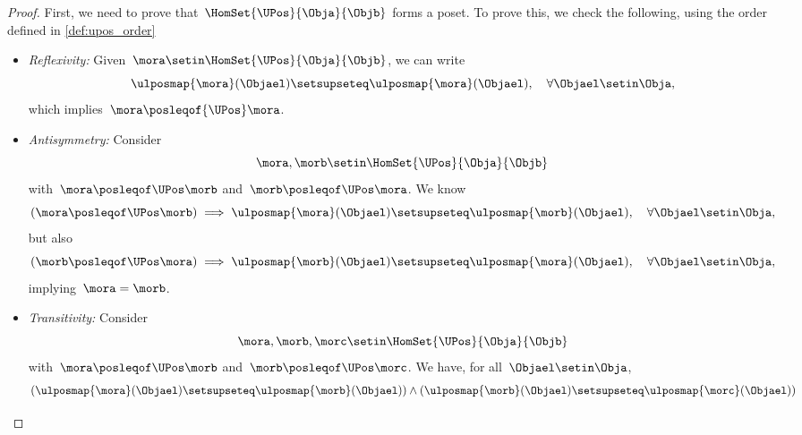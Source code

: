 \begin{proof}
    First, we need to prove that~$\HomSet{\UPos}{\Obja}{\Objb}$ forms a poset.
    To prove this, we check the following, using the order defined in \cref{def:upos_order}
    \begin{itemize}
        \item \emph{Reflexivity:} Given~$\mora \setin \HomSet{\UPos}{\Obja}{\Objb}$, we can write
              \begin{equation}
                  \ulposmap{\mora}(\Objael) \setsupseteq \ulposmap{\mora}(\Objael), \quad \forall \Objael \setin \Obja,
              \end{equation}
              which implies~$\mora \posleqof{\UPos} \mora$.
        \item \emph{Antisymmetry:}
              Consider
              \begin{equation}
                  \mora,\morb \setin \HomSet{\UPos}{\Obja}{\Objb}
              \end{equation} with~$\mora \posleqof\UPos \morb$ and~$\morb \posleqof\UPos \mora$.
              We know
              \begin{equation}
                  (\mora \posleqof\UPos \morb)
                  \implies \ulposmap{\mora}(\Objael) \setsupseteq \ulposmap{\morb}(\Objael), \quad \forall \Objael \setin \Obja,
              \end{equation}
              but also
              \begin{equation}
                  (\morb \posleqof\UPos \mora)
                  \implies \ulposmap{\morb}(\Objael) \setsupseteq \ulposmap{\mora}(\Objael), \quad \forall \Objael \setin \Obja,
              \end{equation}
              implying~$\mora=\morb$.
        \item \emph{Transitivity:}
              Consider
              \begin{equation}
                  \mora,\morb,\morc \setin \HomSet{\UPos}{\Obja}{\Objb}
              \end{equation}
              with~$\mora \posleqof\UPos \morb$ and~$\morb \posleqof\UPos \morc$.
              We have, for all~$\Objael\setin \Obja$,
              \begin{equation}
                  \begin{aligned}
                      (\ulposmap{\mora}(\Objael) \setsupseteq \ulposmap{\morb}(\Objael))
                      \wedge ( \ulposmap{\morb}(\Objael) \setsupseteq \ulposmap{\morc}(\Objael))

\end{aligned}
\end{equation}
\end{itemize}
\end{proof}
